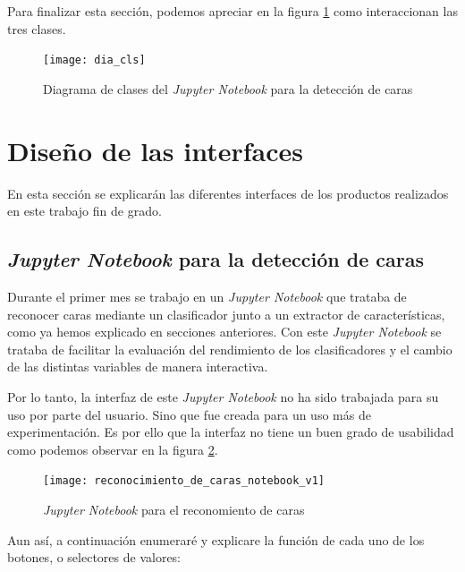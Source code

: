 Para finalizar esta sección, podemos apreciar en la figura \ref{fig:C.4.6} como interaccionan las tres clases.

\begin{figure}[h]
\centering
\texttt{[image: dia\_cls]}
\caption{Diagrama de clases del \textit{Jupyter Notebook} para la detección de caras}
\label{fig:C.4.6}
\end{figure}

\section{Diseño de las interfaces}

En esta sección se explicarán las diferentes interfaces de los productos realizados en este trabajo fin de grado.

\subsection{\textit{Jupyter Notebook} para la detección de caras}

Durante el primer mes se trabajo en un \textit{Jupyter Notebook} que trataba de reconocer caras mediante un clasificador junto a un extractor de características, como ya hemos explicado en secciones anteriores. Con este \textit{Jupyter Notebook} se trataba de facilitar la evaluación del rendimiento de los clasificadores y el cambio de las distintas variables de manera interactiva. 

Por lo tanto, la interfaz de este \textit{Jupyter Notebook} no ha sido trabajada para su uso por parte del usuario. Sino que fue creada para un uso más de experimentación. Es por ello que la interfaz no tiene un buen grado de usabilidad como podemos observar en la figura \ref{fig:C.5.1}.

\begin{figure}[h]
\centering
\texttt{[image: reconocimiento\_de\_caras\_notebook\_v1]}
\caption{\textit{Jupyter Notebook} para el reconomiento de caras}
\label{fig:C.5.1}
\end{figure}

Aun así, a continuación enumeraré y explicare la función de cada uno de los botones, o selectores de valores:

